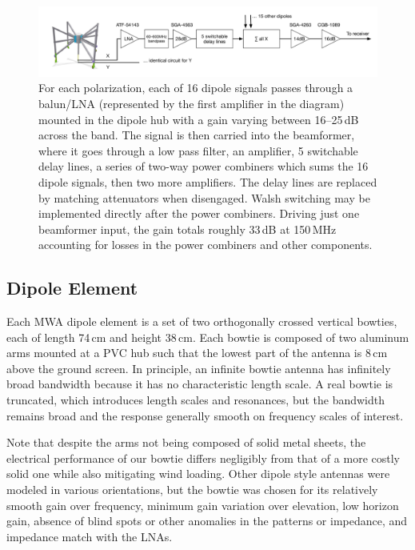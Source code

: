 \begin{figure}[h]
\includegraphics[width=7in]{chap2_beamforming_errors/beamformer_signal_path.pdf}
\caption[Beamformer signal path.]{For each polarization, each of 16 dipole signals passes through a balun/LNA (represented by the first amplifier in the diagram) mounted in the dipole hub with a gain varying between 16--25\,dB across the band. The signal is then carried into the beamformer, where it goes through a low pass filter, an amplifier, 5 switchable delay lines, a series of two-way power combiners which sums the 16 dipole signals, then two more amplifiers. The delay lines are replaced by matching attenuators when disengaged. Walsh switching may be implemented directly after the power combiners. Driving just one beamformer input, the gain totals roughly 33\,dB at 150\,MHz accounting for losses in the power combiners and other components. }
\label{fig:beamformersdiagram}
\end{figure}

\subsection{Dipole Element}

Each MWA dipole element is a set of two orthogonally crossed vertical bowties, each of length 74\,cm and height 38\,cm. Each bowtie is composed of two aluminum arms mounted at a PVC hub such that the lowest part of the antenna is 8\,cm above the ground screen. In principle, an infinite bowtie antenna has infinitely broad bandwidth because it has no characteristic length scale. A real bowtie is truncated, which introduces length scales and resonances, but the bandwidth remains broad and the response generally smooth on frequency scales of interest. 

Note that despite the arms not being composed of solid metal sheets, the electrical performance of our bowtie differs negligibly from that of a more costly solid one while also mitigating wind loading. Other dipole style antennas were modeled in various orientations, but the bowtie was chosen for its relatively smooth gain over frequency, minimum gain variation over elevation, low horizon gain, absence of blind spots or other anomalies in the patterns or impedance, and impedance match with the LNAs.


